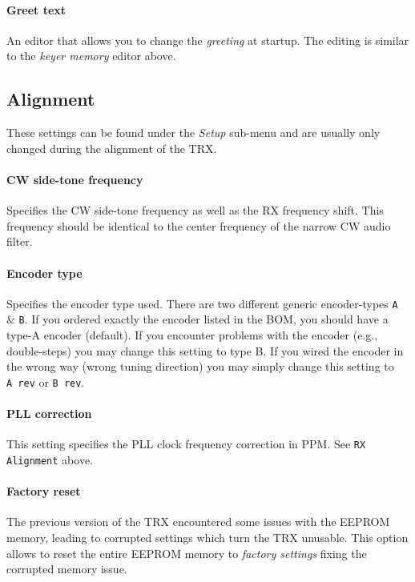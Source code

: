 \documentclass[10pt, a4paper,twoside]{scrartcl}
\begin{document}
\paragraph{Greet text}
An editor that allows you to change the \emph{greeting} at startup. The editing is similar to the \emph{keyer memory} editor above.


\subsection{Alignment}
These settings can be found under the \emph{Setup} sub-menu and are usually only changed during the alignment of the TRX. 

\paragraph{CW side-tone frequency}
Specifies the CW side-tone frequency as well as the RX frequency shift. This frequency should be identical to the center frequency of the narrow CW audio filter.

\paragraph{Encoder type}
Specifies the encoder type used. There are two different generic encoder-types \texttt{A} \& \texttt{B}. If you ordered exactly the encoder listed in the BOM, you should have a type-A encoder (default). If you encounter problems with the encoder (e.g., double-steps) you may change this setting to type B. If you wired the encoder in the wrong way (wrong tuning direction) you may simply change this setting to \texttt{A~rev} or \texttt{B~rev}. 

\paragraph{PLL correction}
This setting specifies the PLL clock frequency correction in PPM. See \texttt{RX Alignment} above.

\paragraph{Factory reset}
The previous version of the TRX encountered some issues with the EEPROM memory, leading to corrupted settings which turn the TRX unusable. This option allows to reset the entire EEPROM memory to \emph{factory settings} fixing the corrupted memory issue.


\cleardoublepage
\end{document}

